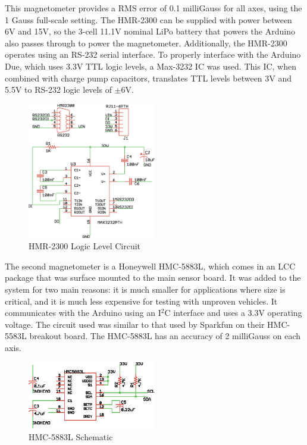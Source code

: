 This magnetometer provides a RMS error of 0.1 milliGauss for all axes, using the 1 Gauss full-scale setting\cite{hmr2300DataSheet}.
The HMR-2300 can be supplied with power between 6V and 15V, so the 3-cell 11.1V nominal LiPo battery that powers the Arduino also passes through to power the magnetometer. Additionally, the HMR-2300 operates using an RS-232 serial interface. To properly interface with the Arduino Due, which uses 3.3V TTL logic levels, a Max-3232 IC was used. This IC, when combined with charge pump capacitors, translates TTL levels between 3V and 5.5V to RS-232 logic levels of $\pm6$V.
 \begin{figure}[H]

   \centering
     \includegraphics[width=0.5\textwidth]{figures/magBoard.eps}
        \caption{HMR-2300 Logic Level Circuit} \label{magBoardSchematic}
 \end{figure}
 
 The second magnetometer is a Honeywell HMC-5883L, which comes in an LCC package that was surface mounted to the main sensor board. It was added to the system for two main reasons: it is much smaller for applications where size is critical, and it is much less expensive for testing with unproven vehicles. It communicates with the Arduino using an I$^2$C interface and uses a 3.3V operating voltage\cite{hmc5883LDatasheet}. The circuit used was similar to that used by Sparkfun on their HMC-5583L breakout board\cite{hmc5883LSchematic}. The HMC-5883L has an accuracy of 2 milliGauss on each axis. 
 
 \begin{figure}[H]

   \centering
     \includegraphics[width=0.5\textwidth]{figures/hmc5883LSchematic.eps}
        \caption{HMC-5883L Schematic} \label{hmc5883LSchematic}
 \end{figure}

